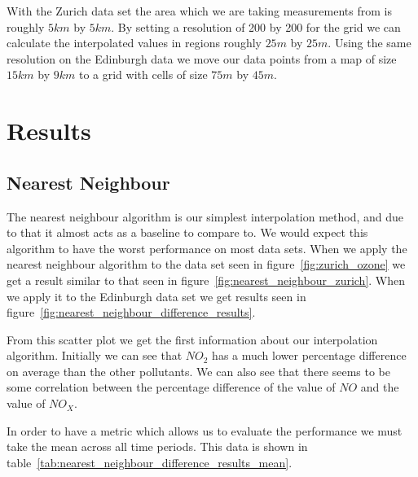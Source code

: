			With the Zurich data set the area which we are taking measurements from is roughly $5km$ by $5km$. By setting a resolution of 200 by 200 for the grid we can calculate the interpolated values in regions roughly $25m$ by $25m$. Using the same resolution on the Edinburgh data we move our data points from a map of size $15km$ by $9km$ to a grid with cells of size $75m$ by $45m$. 


    \section{Results}\label{prediction_evaluation_results}

        \subsection{Nearest Neighbour}\label{prediction_evaluation_results_nearest_neighbour}


	        The nearest neighbour algorithm is our simplest interpolation method, and due to that it almost acts as a baseline to compare to. We would expect this algorithm to have the worst performance on most data sets. When we apply the nearest neighbour algorithm to the data set seen in figure~\ref{fig:zurich_ozone} we get a result similar to that seen in figure~\ref{fig:nearest_neighbour_zurich}. When we apply it to the Edinburgh data set we get results seen in figure~\ref{fig:nearest_neighbour_difference_results}. 


			From this scatter plot we get the first information about our interpolation algorithm. Initially we can see that $NO_{2}$ has a much lower percentage difference on average than the other pollutants. We can also see that there seems to be some correlation between the percentage difference of the value of $NO$ and the value of $NO_{X}$. 

			In order to have a metric which allows us to evaluate the performance we must take the mean across all time periods. This data is shown in table~\ref{tab:nearest_neighbour_difference_results_mean}. 

